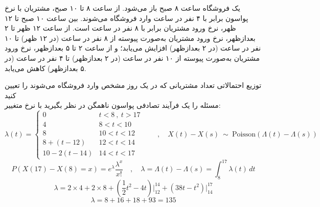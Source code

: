 \documentclass[11pt, a4, twoside]{article}
\begin{document}
\begin{problem}
    یک فروشگاه ساعت ۸ صبح باز می‌شود. از ساعت ۸ تا ۱۰ صبح، مشتریان با نرخ پواسون برابر با ۴ نفر در ساعت وارد فروشگاه می‌شوند. بین ساعت ۱۰ صبح تا ۱۲ ظهر، نرخ ورود مشتریان برابر با ۸ نفر در ساعت است. از ساعت ۱۲ ظهر تا ۲ بعدازظهر، نرخ ورود مشتریان به‌صورت پیوسته از ۸ نفر در ساعت (در ۱۲ ظهر) تا ۱۰ نفر در ساعت (در ۲ بعدازظهر) افزایش می‌یابد؛ و از ساعت ۲ تا ۵ بعدازظهر، نرخ ورود مشتریان به‌صورت پیوسته از ۱۰ نفر در ساعت (در ۲ بعدازظهر) تا ۴ نفر در ساعت (در ۵ بعدازظهر) کاهش می‌یابد. 

    توزیع احتمالاتی تعداد مشتریانی که در یک روز مشخص وارد فروشگاه می‌شوند را تعیین کنید
    {\\ \color{blue}
    مسئله را یک فرآیند تصادفی پواسون ناهمگن در نظر بگیرید با نرخ متغییر:
    \[\lambda(t) = \begin{cases}
        0 & t < 8 \ , \ t > 17 \\
        4 & 8 < t < 10 \\
        8 & 10 < t < 12 \\
        8 + (t - 12)  &  12 < t < 14 \\
        10 - 2(t - 14)  & 14 < t < 17
    \end{cases} \qquad , \quad X(t) - X(s) \ \sim \ \textrm{Poisson}(\Lambda(t) - \Lambda(s))\]
    \[P(X(17) - X(8) = x) = e^\lambda \frac{\lambda^x}{x!} \quad , \quad \lambda = \Lambda(t) - \Lambda(s) = \int_8^{17} \lambda(t) \,dt \]
    \[\lambda = 2 \times 4 + 2 \times 8 + \left(\frac{1}{2}t^2 - 4t\right)\Big|^{14}_{12} + \left(38t - t^2\right)\Big|^{17}_{14}\]
    \[\lambda = 8 + 16 + 18 + 93 = 135 \]
    }
\end{problem}    
\end{document}
